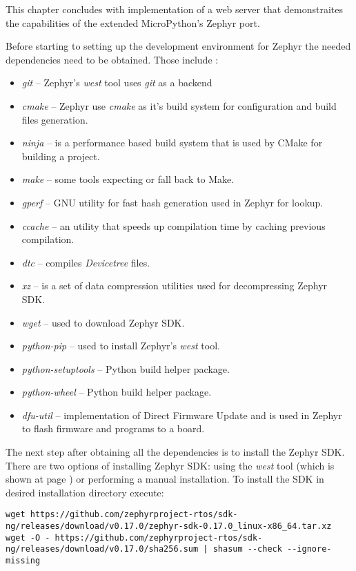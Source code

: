 \documentclass[twoside, 12pt]{article}
\begin{document}
This chapter concludes with implementation of a web server that demonstraites the capabilities of the extended MicroPython's Zephyr port.

Before starting to setting up the development environment for Zephyr the needed dependencies 
need to be obtained. Those include :
\begin{itemize}
    \item \textit{git} -- Zephyr's \textit{west} tool uses \textit{git} as a backend
    \item \textit{cmake} -- Zephyr use \textit{cmake} as it's build system for configuration 
    and build files generation.
    \item \textit{ninja} -- is a performance based build system that is used by CMake for building a project.
    \item \textit{make} -- some tools expecting or fall back to Make.
    \item \textit{gperf} -- GNU utility for fast hash generation used in Zephyr for lookup. 
    \item \textit{ccache} -- an utility that speeds up compilation time by caching previous compilation.  
    \item \textit{dtc} -- compiles \textit{Devicetree} files.
    \item \textit{xz} -- is a set of data compression utilities used for decompressing Zephyr SDK.
    \item \textit{wget} -- used to download Zephyr SDK.
    \item \textit{python-pip} -- used to install Zephyr's \textit{west} tool.
    \item \textit{python-setuptools} -- Python build helper package.
    \item \textit{python-wheel} -- Python build helper package.
    \item \textit{dfu-util} -- implementation of Direct Firmware Update and is used in Zephyr to flash firmware and programs to a board. 
\end{itemize}

The next step after obtaining all the dependencies is to install the Zephyr SDK. There are
two options of installing Zephyr SDK: using the \textit{west} tool (which is shown at page \pageref{west_sdk_install}) or 
performing a manual installation. To install the SDK in desired installation directory 
execute:
\begin{lstlisting}[caption=Installing Zephyr SDK: obtaining SDK, breaklines=true]
wget https://github.com/zephyrproject-rtos/sdk-ng/releases/download/v0.17.0/zephyr-sdk-0.17.0_linux-x86_64.tar.xz
wget -O - https://github.com/zephyrproject-rtos/sdk-ng/releases/download/v0.17.0/sha256.sum | shasum --check --ignore-missing
\end{lstlisting}
\end{document}
